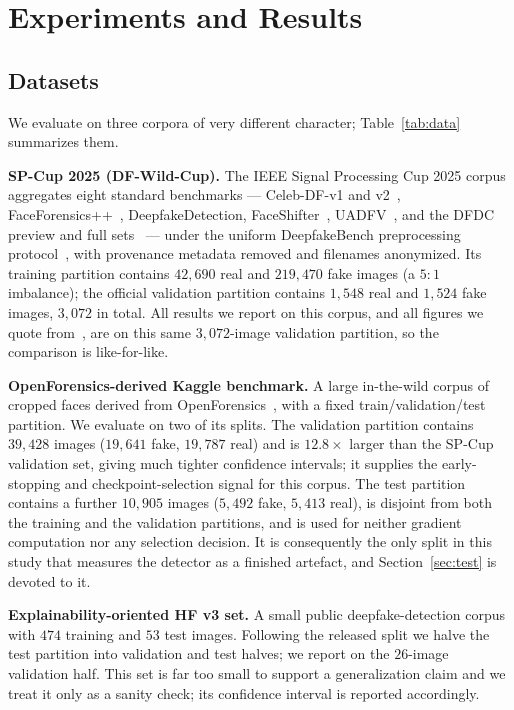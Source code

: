 \documentclass[10pt,journal]{IEEEtran}
\begin{document}
\section{Experiments and Results}\label{sec:exp}

\subsection{Datasets}
We evaluate on three corpora of very different character; Table~\ref{tab:data}
summarizes them.

\textbf{SP-Cup 2025 (DF-Wild-Cup).} The IEEE Signal Processing Cup 2025 corpus
aggregates eight standard benchmarks --- Celeb-DF-v1 and
v2~\cite{li2020celebdf}, FaceForensics++~\cite{rossler2019faceforensics},
DeepfakeDetection, FaceShifter~\cite{li2019faceshifter},
UADFV~\cite{yang2019uadfv}, and the DFDC preview and full
sets~\cite{dolhansky2020dfdc} --- under the uniform DeepfakeBench
preprocessing protocol~\cite{yan2023deepfakebench}, with provenance metadata
removed and filenames anonymized. Its training partition contains $42{,}690$
real and $219{,}470$ fake images (a $5{:}1$ imbalance); the official validation
partition contains $1{,}548$ real and $1{,}524$ fake images, $3{,}072$ in total.
All results we report on this corpus, and all figures we quote
from~\cite{bhattacharjee2026caenet}, are on this same $3{,}072$-image
validation partition, so the comparison is like-for-like.

\textbf{OpenForensics-derived Kaggle benchmark.} A large in-the-wild corpus
of cropped faces derived from OpenForensics~\cite{le2021openforensics}, with a
fixed train/validation/test partition. We evaluate on two of its splits. The
validation partition contains $39{,}428$ images ($19{,}641$ fake, $19{,}787$
real) and is $12.8\times$ larger than the SP-Cup validation set, giving much
tighter confidence intervals; it supplies the early-stopping and
checkpoint-selection signal for this corpus. The test partition contains a
further $10{,}905$ images ($5{,}492$ fake, $5{,}413$ real), is disjoint from
both the training and the validation partitions, and is used for neither
gradient computation nor any selection decision. It is consequently the only
split in this study that measures the detector as a finished artefact, and
Section~\ref{sec:test} is devoted to it.

\textbf{Explainability-oriented HF v3 set.} A small public
deepfake-detection corpus with $474$ training and $53$ test images. Following
the released split we halve the test partition into validation and test
halves; we report on the $26$-image validation half. This set is far too
small to support a generalization claim and we treat it only as a sanity
check; its confidence interval is reported accordingly.
\end{document}
